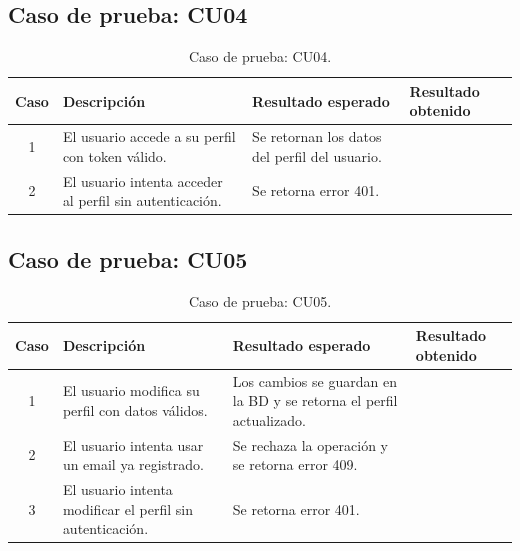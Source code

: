 
\subsection{Caso de prueba: CU04}

\begin{table}[H]
\centering
\label{tab:cu04_white_test}
\renewcommand{\arraystretch}{1.3}
\begin{tabular}{|c|p{5cm}|p{6cm}|p{2.5cm}|}
\hline
\rowcolor[RGB]{217,217,217}
\textbf{Caso} & \textbf{Descripción} & \textbf{Resultado esperado} & \textbf{Resultado obtenido} \\
\hline

1 &
El usuario accede a su perfil con token válido. &
Se retornan los datos del perfil del usuario. &
 \\
\hline

2 &
El usuario intenta acceder al perfil sin autenticación. &
Se retorna error 401. &
 \\
\hline

\end{tabular}
\caption{Caso de prueba: CU04.}
\end{table}


\subsection{Caso de prueba: CU05}

\begin{table}[H]
\centering
\label{tab:cu05_white_test}
\renewcommand{\arraystretch}{1.3}
\begin{tabular}{|c|p{5cm}|p{6cm}|p{2.5cm}|}
\hline
\rowcolor[RGB]{217,217,217}
\textbf{Caso} & \textbf{Descripción} & \textbf{Resultado esperado} & \textbf{Resultado obtenido} \\
\hline

1 &
El usuario modifica su perfil con datos válidos. &
Los cambios se guardan en la BD y se retorna el perfil actualizado. &
 \\
\hline

2 &
El usuario intenta usar un email ya registrado. &
Se rechaza la operación y se retorna error 409. &
 \\
\hline

3 &
El usuario intenta modificar el perfil sin autenticación. &
Se retorna error 401. &
 \\
\hline

\end{tabular}
\caption{Caso de prueba: CU05.}
\end{table}

